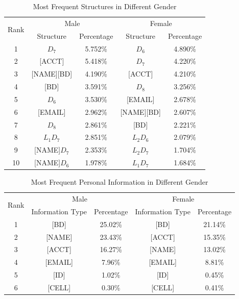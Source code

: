 \documentclass{sig-alternate}
\begin{document}
\begin{table}
\centering
\caption{Most Frequent Structures in Different Gender}
\begin{adjustbox}{max width=0.48\textwidth}
\begin{tabular}{|c|c|c|c|c|} \hline
\multirow{2}{*}{Rank}&\multicolumn{2}{|c|}{Male}&\multicolumn{2}{|c|}{Female}\\ \cline{2-5}
&Structure&Percentage&Structure&Percentage\\ \hline
1&$D_7$&5.752\%&$D_6$&4.890\%\\
2&[ACCT]&5.418\%&$D_7$&4.220\%\\
3&[NAME][BD]&4.190\%&[ACCT]&4.210\%\\
4&[BD]&3.591\%&$D_8$&3.256\%\\
5&$D_6$&3.530\%&[EMAIL]&2.678\%\\
6&[EMAIL]&2.962\%&[NAME][BD]&2.607\%\\
7&$D_8$&2.861\%&[BD]&2.221\%\\
8&$L_1D_7$&2.851\%&$L_2D_6$&2.079\%\\
9&[NAME]$D_7$&2.353\%&$L_2D_7$&1.704\%\\
10&[NAME]$D_6$&1.978\%&$L_1D_7$&1.684\%\\
\hline\end{tabular}
\end{adjustbox}
\label{t5}
\end{table}

\begin{table}
\centering
\caption{Most Frequent Personal Information in Different Gender}
\begin{adjustbox}{max width=0.48\textwidth}
\begin{tabular}{|c|c|c|c|c|} \hline
\multirow{2}{*}{Rank}&\multicolumn{2}{|c|}{Male}&\multicolumn{2}{|c|}{Female}\\ \cline{2-5}
&Information Type&Percentage&Information Type&Percentage\\ \hline
1&[BD]&25.02\%&[BD]&21.14\%  \\
2&[NAME]&23.43\%&[ACCT]&15.35\%\\
3&[ACCT]&16.27\%&[NAME]&13.02\%\\
4&[EMAIL]&7.96\%&[EMAIL]&8.81\%\\
5&[ID]&1.02\%&[ID]&0.45\%\\
6&[CELL]&0.30\%&[CELL]&0.41\%\\
\hline\end{tabular}
\end{adjustbox}
\label{t6}
\end{table}
\end{document}
